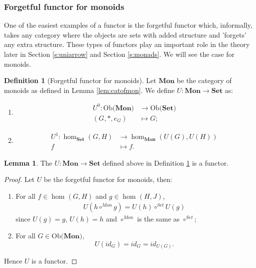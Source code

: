 \documentclass[11pt,a4paper]{article}
\theoremstyle{definition}
\newtheorem{lemma}[thm]{Lemma}
\newtheorem{definition}[thm]{Definition}
\newcommand\ho[3][]{\hom_{#1}(#2,#3)}
\newcommand\ob[1]{\mathrm{Ob(}#1\mathrm{)}}
\numberwithin{equation}{section}
\begin{document}
\subsubsection{Forgetful functor for monoids}
\label{sss:forgetfunctors}
One of the easiest examples of a functor is the forgetful functor which, informally, takes any category where the objects are sets with added structure and 'forgets' any extra structure. These types of functors play an important role in the theory later in Section \ref{s:uniarrow} and Section \ref{s:monads}. We will see the case for monoids.
\begin{definition}[Forgetful functor for monoids]
\label{def:forgetfulfunctormon}
Let $\mathbf{Mon}$ be the category of monoids as defined in Lemma \ref{lem:catofmon}. We define $U\colon \mathbf{Mon}\rightarrow\mathbf{Set}$ as:
\begin{enumerate}
    \item \begin{align*}
        U^0\colon \ob{\mathbf{Mon}}&\rightarrow\ob{\mathbf{Set}}\\
        (G,*,e_{G})&\mapsto G;
    \end{align*}
    \item \begin{align*}
        U^1\colon \ho[\mathbf{Set}]{G}{H}&\rightarrow\ho[\mathbf{Mon}]{U(G)}{U(H)}\\
        f &\mapsto f.
    \end{align*}
\end{enumerate}
\end{definition}
\begin{lemma}
    The $U\colon \mathbf{Mon}\rightarrow\mathbf{Set}$ defined above in Definition \ref{def:forgetfulfunctormon} is a functor.
\end{lemma}
\begin{proof}
Let $U$ be the forgetful functor for monoids, then:
\begin{enumerate}
    \item For all $f\in\ho{G}{H}$ and $g\in\ho{H}{J}$,
    \begin{align*}
        U(h\circ^{Mon} g) = U(h) \circ^{Set} U(g)
    \end{align*}
    since $U(g) = g$, $U(h) = h$ and $\circ^{Mon}$ is the same as $\circ^{Set}$;
    \item For all $G\in\ob{\mathbf{Mon}}$, 
    \[U(id_{G}) = id_{G} = id_{U(G)}.\]
\end{enumerate}
Hence $U$ is a functor.
\end{proof}
\end{document}
